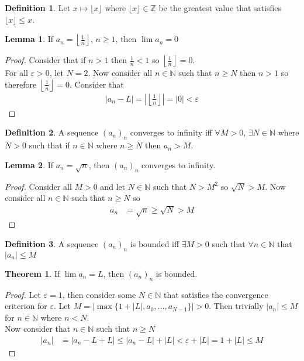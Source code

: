 \documentclass[12pt]{article}
\theoremstyle{definition}
\newtheorem{definition}{Definition}
\theoremstyle{definition}
\newtheorem{theorem}{Theorem}
\theoremstyle{definition}
\newtheorem{lemma}{Lemma}
\theoremstyle{definition}
\begin{document}
\begin{flushleft}
\begin{definition}
    Let $x \mapsto \lfloor x \rfloor$ where $\lfloor x \rfloor \in \mathbb{Z}$ be the greatest value that satisfies $\lfloor x \rfloor \leq x$.
\end{definition}

\begin{lemma}
    If $a_n = \left\lfloor\frac{1}{n}\right\rfloor$, $n \geq 1$, then $\lim a_n = 0$
\end{lemma}
\begin{proof}
    Consider that if $n > 1$ then $\frac{1}{n} < 1$ so $\left\lfloor\frac{1}{n}\right\rfloor = 0$. \\
    For all $\varepsilon > 0$, let $N = 2$. Now consider all $n \in \mathbb{N}$ such that $n \geq N$ then $n > 1$ so therefore $\left\lfloor\frac{1}{n}\right\rfloor = 0$. Consider that
    \begin{align*}
        |a_n - L| = \left|\left\lfloor\frac{1}{n}\right\rfloor\right| = |0| < \varepsilon
    \end{align*}
\end{proof}

\begin{definition}
    A sequence $(a_n)_n$ converges to infinity iff $\forall M > 0$, $\exists N \in \mathbb{N}$ where $N > 0$ such that if $n \in \mathbb{N}$ where $n \geq N$ then $a_n > M$.
\end{definition}

\begin{lemma}
    If $a_n = \sqrt{n}$, then $(a_n)_n$ converges to infinity.
\end{lemma}
\begin{proof}
    Consider all $M > 0$ and let $N \in \mathbb{N}$ such that $N > M^2$ so $\sqrt{N} > M$.
    Now consider all $n \in \mathbb{N}$ such that $n \geq N$ so
    \begin{align*}
        a_n
        &= \sqrt{n}
        \geq \sqrt{N}
        > M
    \end{align*}
\end{proof}

\begin{definition}
    A sequence $(a_n)_n$ is bounded iff $\exists M > 0$ such that $\forall n \in \mathbb{N}$ that $|a_n| \leq M$
\end{definition}

\begin{theorem}
    If $\lim a_n = L$, then $(a_n)_n$ is bounded.
\end{theorem}
\begin{proof}
    Let $\varepsilon = 1$, then consider some $N \in \mathbb{N}$ that satisfies the convergence criterion for $\varepsilon$. Let $M = \left|\max\{1 + |L|, a_0, \ldots, a_{N - 1}\}\right| > 0$. Then trivially $|a_n| \leq M$ for $n \in \mathbb{N}$ where $n < N$. \\
    Now consider that $n \in \mathbb{N}$ such that $n \geq N$
    \begin{align*}
        |a_n|
        &= |a_n - L + L|
        \leq |a_n - L| + |L|
        < \varepsilon + |L|
        = 1 + |L| \leq M
    \end{align*}
\end{proof}


\end{flushleft}
\end{document}
